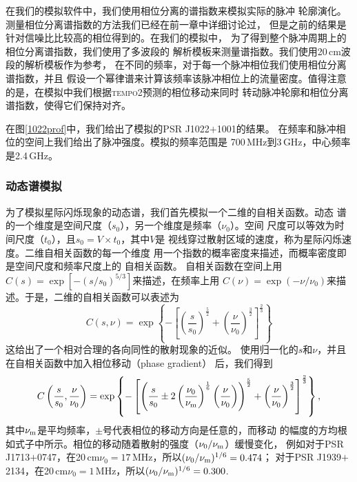 在我们的模拟软件中，我们使用相位分离的谱指数来模拟实际的脉冲
轮廓演化。测量相位分离谱指数的方法我们已经在前一章中详细讨论过，
但是之前的结果是针对信噪比比较高的相位得到的。在我们的模拟中，
为了得到整个脉冲周期上的相位分离谱指数，我们使用了多波段的
解析模板来测量谱指数。我们使用20\,cm波段的解析模板作为参考，
在不同的频率，对于每一个脉冲相位我们使用相位分离谱指数，并且
假设一个幂律谱来计算该频率该脉冲相位上的流量密度。值得注意
的是，在模拟中我们根据\textsc{tempo2}预测的相位移动来同时
转动脉冲轮廓和相位分离谱指数，使得它们保持对齐。

在图\ref{1022prof}中，我们给出了模拟的PSR J1022$+$1001的结果。
在频率和脉冲相位的空间上我们给出了脉冲强度。模拟的频率范围是
700\,MHz到3\,GHz，中心频率是2.4\,GHz。

\subsubsection{动态谱模拟}

为了模拟星际闪烁现象的动态谱，我们首先模拟一个二维的自相关函数。动态
谱的一个维度是空间尺度（$s_0$），另一个维度是频率（$\nu_0$）。空间
尺度可以等效为时间尺度（$t_0$），且$s_0 = V\times t_0$，其中$V$是
视线穿过散射区域的速度，称为星际闪烁速度。二维自相关函数的每一个维度
用一个指数的概率密度来描述，而概率密度即是空间尺度和频率尺度上的
自相关函数。
%
自相关函数在空间上用$C(s) = \exp[-(s/s_0)^{5/3}]$来描述，在频率上用
$C(\nu) = \exp(-\nu/\nu_0)$来描述。于是，二维的自相关函数可以表述为
\begin{equation}
\label{acf}
C(s,\nu) = \exp\left\{-\left[\left(\frac{s}{s_0}\right)^{\frac{5}{2}} + \left(\frac{\nu}{\nu_0}\right)^{\frac{3}{2}}\right]^{\frac{2}{3}}\right\}
\end{equation}
这给出了一个相对合理的各向同性的散射现象的近似。
%
使用归一化的$s$和$\nu$，并且在自相关函数中加入相位移动（phase gradient）
后，我们得到
\begin{equation}
C\left(\frac{s}{s_0},\frac{\nu}{\nu_0}\right)=\exp\left\{-\left[\left(\frac{s}{s_0} \pm 2\left(\frac{\nu_0}{\nu_{\rm{m}}}\right)^{\frac{1}{6}}\left(\frac{\nu}{\nu_0}\right)\right)^{\frac{5}{2}} + \left(\frac{\nu}{\nu_0}\right)^{\frac{3}{2}}\right]^{\frac{2}{3}}\right\},
\end{equation}
其中$\nu_{\rm{m}}$是平均频率，$\pm$号代表相位的移动方向是任意的，而移动
的幅度的方均根如式子中所示。相位的移动随着散射的强度（$\nu_0/\nu_{\rm{m}}$）缓慢变化，
例如对于PSR J1713$+$0747，在20\,cm$\nu_0=17$\,MHz，所以$(\nu_0/\nu_{\rm{m}})^{1/6} = 0.474$；
对于PSR J1939$+$2134，在20\,cm$\nu_0=1$\,MHz，所以$(\nu_0/\nu_{\rm{m}})^{1/6} = 0.300$.

